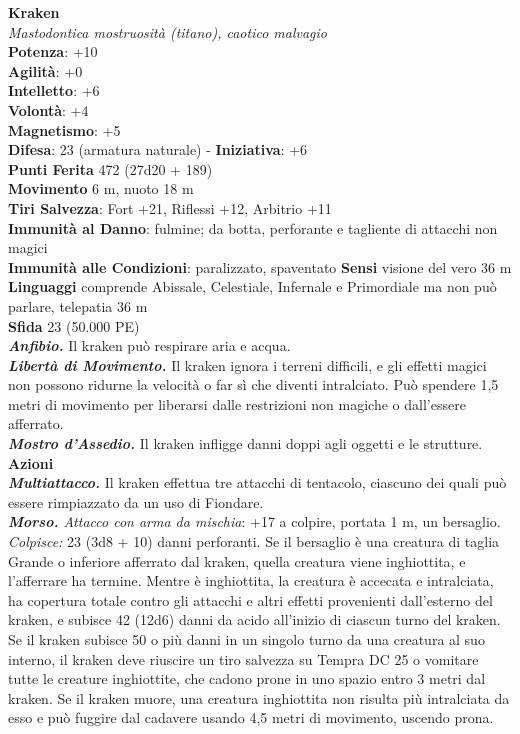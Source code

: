 \begin{multicols}{2}
\medskip\textbf{Kraken}\\
\emph{Mastodontica mostruosità (titano), caotico malvagio}\\
\textbf{Potenza}: +10\\
\textbf{Agilità}: +0\\
\textbf{Intelletto}: +6\\
\textbf{Volontà}: +4\\
\textbf{Magnetismo}: +5\\
\textbf{Difesa}: 23 (armatura naturale) - \textbf{Iniziativa}: +6\\
\textbf{Punti Ferita} 472 (27d20 + 189) \\
\textbf{Movimento} 6 m, nuoto 18 m\\
\textbf{Tiri Salvezza}: Fort +21, Riflessi +12, Arbitrio +11\\
\textbf{Immunità al Danno}: fulmine; da botta, perforante e tagliente di attacchi non magici\\
\textbf{Immunità alle Condizioni}: paralizzato, spaventato
\textbf{Sensi} visione del vero 36 m\\
\textbf{Linguaggi} comprende Abissale, Celestiale, Infernale e Primordiale ma non può parlare, telepatia 36 m \\
\textbf{Sfida} 23 (50.000 PE)\smallskip\\
\emph{\textbf{Anfibio.}} Il kraken può respirare aria e acqua.\\
\emph{\textbf{Libertà di Movimento.}} Il kraken ignora i terreni difficili, e gli effetti magici non possono ridurne la velocità o far sì che diventi intralciato. Può spendere 1,5 metri di movimento per liberarsi dalle restrizioni non magiche o dall'essere afferrato.\\
\emph{\textbf{Mostro d'Assedio.}} Il kraken infligge danni doppi agli oggetti e le strutture.\\
\smallskip\textbf{Azioni}\\
\emph{\textbf{Multiattacco.}} Il kraken effettua tre attacchi di tentacolo, ciascuno dei quali può essere rimpiazzato da un uso di Fiondare.\\
\emph{\textbf{Morso.} Attacco con arma da mischia}: +17 a colpire, portata 1 m, un bersaglio.\\
\emph{Colpisce:} 23 (3d8 + 10) danni perforanti. Se il bersaglio è una creatura di taglia Grande o inferiore afferrato dal kraken, quella creatura viene inghiottita, e l'afferrare ha termine. Mentre è inghiottita, la creatura è accecata e intralciata, ha copertura totale contro gli attacchi e altri effetti provenienti dall'esterno del kraken, e subisce 42 (12d6) danni da acido all'inizio di ciascun turno del kraken.\\
Se il kraken subisce 50 o più danni in un singolo turno da una creatura al suo interno, il kraken deve riuscire un tiro salvezza su Tempra DC 25 o vomitare tutte le creature inghiottite, che cadono prone in uno spazio entro 3 metri dal kraken. Se il kraken muore, una creatura inghiottita non risulta più intralciata da esso e può fuggire dal cadavere usando 4,5 metri di movimento, uscendo prona.\\


\end{multicols}
